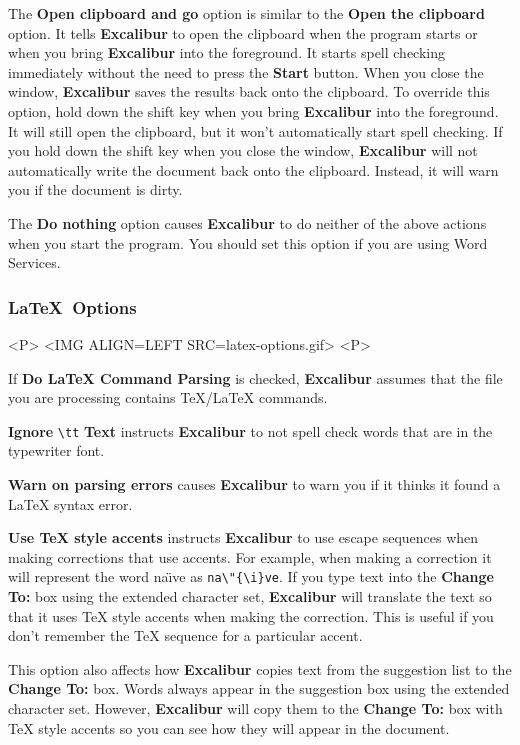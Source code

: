 \documentclass[11pt,titlepage]{article}
\newcommand{\ex}{\textbf{Excalibur}}
\begin{document}
The \textbf{Open clipboard and go} option is similar to the
\textbf{Open the clipboard} option.  It tells \ex{} to open the
clipboard when the program starts or when you bring \ex{} into the
foreground.  It starts spell checking immediately without the need to
press the \textbf{Start} button.  When you close the window, \ex{}
saves the results back onto the clipboard.  To override this option,
hold down the shift key when you bring \ex{} into the foreground.  It
will still open the clipboard, but it won't automatically start spell
checking.  If you hold down the shift key when you close the window,
\ex{} will not automatically write the document back onto the
clipboard.  Instead, it will warn you if the document is dirty.

The \textbf{Do nothing} option causes \ex{} to do neither of the above
actions when you start the program.  You should set this option if you
are using Word Services.

\subsubsection{\LaTeX\ Options}
\label{sec:latex-options}

\begin{rawhtml}
<P>
<IMG ALIGN=LEFT SRC=latex-options.gif>
<P>
\end{rawhtml}

If \textbf{Do \LaTeX{} Command Parsing} is checked, \ex{} assumes that
the file you are processing contains \TeX/\LaTeX{} commands.

\textbf{Ignore} \verb+\tt+ \textbf{Text} instructs \ex{} to not spell
check words that are in the typewriter font.

\textbf{Warn on parsing errors} causes \ex{} to warn you if it thinks
it found a \LaTeX{} syntax error.

\textbf{Use \TeX{} style accents} instructs \ex{} to use escape
sequences when making corrections that use accents.  For example, when
making a correction it will represent the word na\"{\i}ve as
\verb+na\"{\i}ve+.  If you type text into the \textbf{Change To:} box
using the extended character set, \ex{} will translate the text so
that it uses \TeX{} style accents when making the correction.  This is
useful if you don't remember the \TeX{} sequence for a particular
accent.

This option also affects how \ex{} copies text from the suggestion
list to the \textbf{Change To:} box.  Words always appear in the
suggestion box using the extended character set.  However, \ex{} will
copy them to the \textbf{Change To:} box with \TeX{} style accents so
you can see how they will appear in the document.
\end{document}
